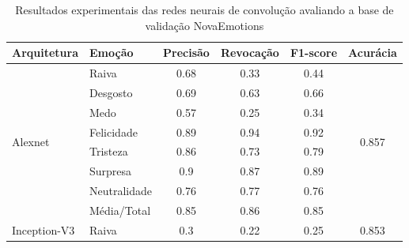 \begin{table}[]
\centering
\caption{Resultados experimentais das redes neurais de convolução avaliando a base de validação NovaEmotions}
\label{table:novaemotions}
\begin{tabular}{llcccc}
\hline
\textbf{Arquitetura}                   & \textbf{Emoção}       & \multicolumn{1}{l}{\textbf{Precisão}} & \multicolumn{1}{l}{\textbf{Revocação}} & \multicolumn{1}{l}{\textbf{F1-score}} & \multicolumn{1}{l}{\textbf{Acurácia}}   \\ \hline
\multirow{8}{*}{Alexnet}         & Raiva                 & 0.68                         & 0.33                          & 0.44                         & \multirow{8}{*}{0.857}         \\
                                       & Desgosto              & 0.69                         & 0.63                          & 0.66                         &                                \\
                                       & Medo                  & 0.57                         & 0.25                          & 0.34                         &                                \\
                                       & Felicidade            & 0.89                         & 0.94                          & 0.92                         &                                \\
                                       & Tristeza              & 0.86                         & 0.73                          & 0.79                         &                                \\
                                       & Surpresa              & 0.9                          & 0.87                          & 0.89                         &                                \\
                                       & Neutralidade          & 0.76                         & 0.77                          & 0.76                         &                                \\
                                       & Média/Total           & 0.85                         & 0.86                          & 0.85                         &                                \\ \hline
\multirow{8}{*}{Inception-V3}     & Raiva                 & 0.3                          & 0.22                          & 0.25                         & \multirow{8}{*}{0.853}         \\

\end{tabular}
\end{table}
